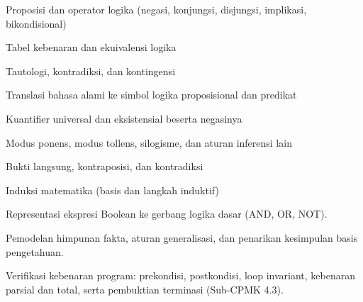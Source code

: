 \begin{checklist}
  \item Proposisi dan operator logika (negasi, konjungsi, disjungsi, implikasi, bikondisional)
  \item Tabel kebenaran dan ekuivalensi logika
  \item Tautologi, kontradiksi, dan kontingensi
  \item Translasi bahasa alami ke simbol logika proposisional dan predikat
  \item Kuantifier universal dan eksistensial beserta negasinya
  \item Modus ponens, modus tollens, silogisme, dan aturan inferensi lain
  \item Bukti langsung, kontraposisi, dan kontradiksi
  \item Induksi matematika (basis dan langkah induktif)
  \item Representasi ekspresi Boolean ke gerbang logika dasar (AND, OR, NOT).
  \item Pemodelan himpunan fakta, aturan generalisasi, dan penarikan kesimpulan basis pengetahuan.
  \item Verifikasi kebenaran program: prekondisi, postkondisi, loop invariant, kebenaran parsial dan total, serta pembuktian terminasi (Sub-CPMK 4.3).
\end{checklist}
